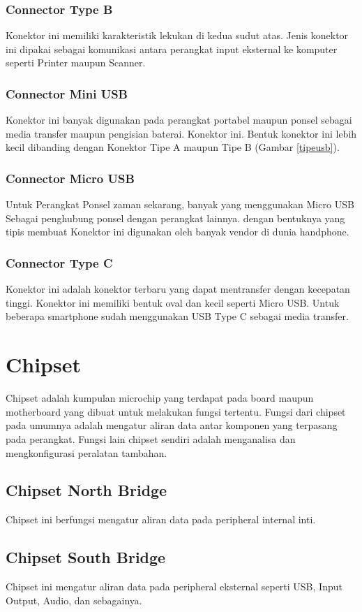 \subsubsection{Connector Type B}
Konektor ini memiliki karakteristik lekukan di kedua sudut atas. Jenis konektor ini dipakai sebagai komunikasi antara perangkat input eksternal ke komputer seperti Printer maupun Scanner.
\subsubsection{Connector Mini USB}
Konektor ini banyak digunakan pada perangkat portabel maupun ponsel sebagai media transfer maupun pengisian baterai. Konektor ini. Bentuk konektor ini lebih kecil dibanding dengan Konektor Tipe A maupun Tipe B (Gambar \ref{tipeusb}).
\subsubsection{Connector Micro USB}
Untuk Perangkat Ponsel zaman sekarang, banyak yang menggunakan Micro USB Sebagai penghubung ponsel dengan perangkat lainnya. dengan bentuknya yang tipis membuat Konektor ini digunakan oleh banyak vendor di dunia handphone.
\subsubsection{Connector Type C}
Konektor ini adalah konektor terbaru yang dapat mentransfer dengan kecepatan tinggi. Konektor ini memiliki bentuk oval dan kecil seperti Micro USB. Untuk beberapa smartphone sudah menggunakan USB Type C sebagai media transfer.
\section{Chipset}
Chipset adalah kumpulan microchip yang terdapat pada board maupun motherboard yang dibuat untuk melakukan fungsi tertentu. Fungsi dari chipset pada umumnya adalah mengatur aliran data antar komponen yang terpasang pada perangkat. Fungsi lain chipset sendiri adalah menganalisa dan mengkonfigurasi peralatan tambahan.
\subsection{Chipset North Bridge}
Chipset ini berfungsi mengatur aliran data pada peripheral internal inti.
\subsection{Chipset South Bridge}
Chipset ini mengatur aliran data pada peripheral eksternal seperti USB, Input Output, Audio, dan sebagainya.
